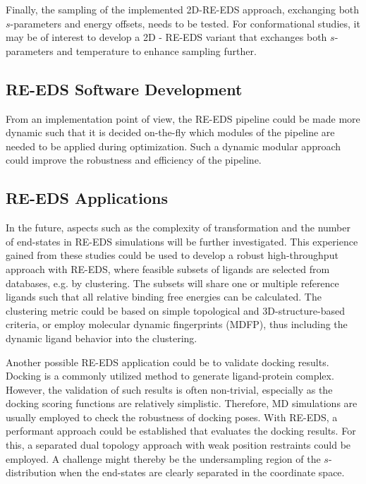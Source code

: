Finally, the sampling of the implemented 2D-RE-EDS approach, exchanging both $s$-parameters and energy offsets, needs to be tested. For conformational studies, it may be of interest to develop a 2D - RE-EDS variant that exchanges both $s$-parameters and temperature to enhance sampling further.

\subsection{RE-EDS Software Development}
From an implementation point of view, the RE-EDS pipeline \cite{Ries2021B} could be made more dynamic such that it is decided on-the-fly which modules of the pipeline are needed to be applied during optimization. Such a dynamic modular approach could improve the robustness and efficiency of the pipeline.


\subsection{RE-EDS Applications}
In the future, aspects such as the complexity of transformation and the number of end-states in RE-EDS simulations will be further investigated. 
This experience gained from these studies could be used to develop a robust high-throughput approach with RE-EDS, where feasible subsets of ligands are selected from databases, e.g. by clustering. The subsets will share one or multiple reference ligands such that all relative binding free energies can be calculated. The clustering metric could be based on simple topological and 3D-structure-based criteria, or employ molecular dynamic fingerprints (MDFP),\cite{Riniker2017} thus including the dynamic ligand behavior into the clustering.


Another possible RE-EDS application could be to validate docking results. Docking is a commonly utilized method to generate ligand-protein complex. \cite{Zhao2015, Eberhardt2021, Morris2009} However, the validation of such results is often non-trivial, especially as the docking scoring functions are relatively simplistic.\cite{Chen2015} Therefore, MD simulations are usually employed to check the robustness of docking poses.\cite{Zhao2015, Feng2015, Sokkar2011, Chavda2019} With RE-EDS, a performant approach could be established that evaluates the docking results. For this, a separated dual topology approach \cite{Rocklin2013} with weak position restraints could be employed. A challenge might thereby be the undersampling region of the $s$-distribution when the end-states are clearly separated in the coordinate space. 


